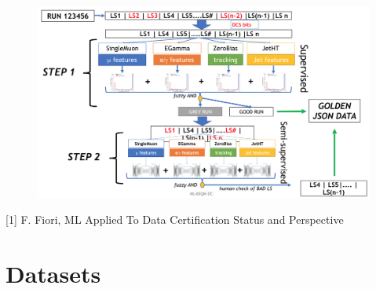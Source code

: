 \documentclass{beamer}
\begin{document}
\begin{frame}
\begin{figure}
\includegraphics[height=0.85\textheight, width=\textwidth]{images/cartoon}
\end{figure}
\tiny [1] F. Fiori, ML Applied To Data Certification Status and Perspective
\end{frame}

\section{Datasets} %
\subsection{}
\end{document}
